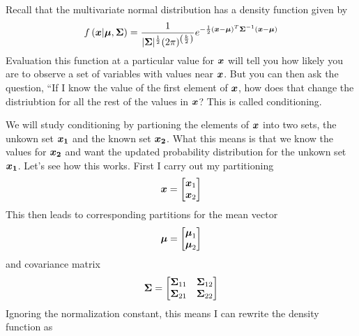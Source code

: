 \documentclass[../../main.tex]{subfiles}
\begin{document}
Recall that the multivariate normal distribution has a density function given
by
\begin{equation}
    f\left(\boldsymbol{x}| \boldsymbol{\mu}, \boldsymbol{\Sigma} \right)
    = \frac{1}{
            |\boldsymbol{\Sigma}|^\frac{1}{2} (2\pi)^{\left(\frac{k}{2}\right)}
        }
        e^{
            -\frac{1}{2}
            (\boldsymbol{x} - \boldsymbol{\mu})^T
            \boldsymbol{\Sigma}^{-1}
            (\boldsymbol{x} - \boldsymbol{\mu})
    }
\end{equation}
Evaluation this function at a particular value for $\boldsymbol{x}$ will tell you how
likely you are to observe a set of variables with values near $\boldsymbol{x}$. But you
can then ask the question, ``If I know the value of the first element of
$\boldsymbol{x}$, how does that change the distriubtion for all the rest of the values
in $\boldsymbol{x}$?  This is called conditioning.

We will study conditioning by partioning the elements of $\boldsymbol{x}$ into two
sets, the unkown set $\boldsymbol{x_1}$ and the known set $\boldsymbol{x_2}$.  What this means
is that we know the values for $\boldsymbol{x_2}$ and want the updated probability
distribution for the unkown set $\boldsymbol{x_1}$. Let's see how this works.  First I
carry out my partitioning
\begin{equation}
    \label{eq:xpartition}
    \boldsymbol{x} = 
    \begin{bmatrix}
        \boldsymbol{x}_1 \\
        \boldsymbol{x}_2
    \end{bmatrix}
\end{equation}
This then leads to corresponding partitions for the mean vector
\begin{equation}
    \label{eq:meanpartition}
    \boldsymbol{\mu} = 
    \begin{bmatrix}
        \boldsymbol{\mu}_1 \\
        \boldsymbol{\mu}_2
    \end{bmatrix}
\end{equation}
and covariance matrix
\begin{equation}
    \label{eq:meanpartition}
    \boldsymbol{\Sigma} = 
    \begin{bmatrix}
        \boldsymbol{\Sigma}_{11} & \boldsymbol{\Sigma}_{12} \\ 
        \boldsymbol{\Sigma}_{21} & \boldsymbol{\Sigma}_{22} \\
    \end{bmatrix}
\end{equation}
Ignoring the normalization constant, this means I can rewrite the density
function as
\end{document}
